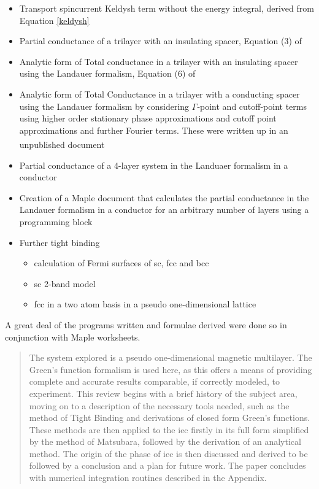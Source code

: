 \documentclass[a4paper, 12pt]{article}
\newcommand{\site}[1]{\textsuperscript{\textcolor{blue}{\cite{#1}}}}
\begin{document}
\begin{itemize}
	\item{Transport spincurrent Keldysh term without the energy integral, derived from Equation \eqref{keldysh}}
	\item{Partial conductance of a trilayer with an insulating spacer, Equation (3) of \textcolor{blue}{\cite{Mathon2016}}}
	\item{Analytic form of Total conductance in a trilayer with an insulating spacer using the Landauer formalism, Equation (6) of \textcolor{blue}{\cite{Mathon2016}}}
	\item{Analytic form of Total Conductance in a trilayer with a conducting spacer using the Landauer formalism by considering $\Gamma$-point and cutoff-point terms using higher order stationary phase approximations and cutoff point approximations and further Fourier terms. These were written up in an unpublished document\site{me}}
	\item{Partial conductance of a 4-layer system in the Landuaer formalism in a conductor}
	\item{Creation of a Maple document that calculates the partial conductance in the Landauer formalism in a conductor for an arbitrary number of layers using a programming block}
	\item{Further tight binding}
		\begin{itemize}
			\item{calculation of Fermi surfaces of \gls{sc}, \gls{fcc} and \gls{bcc}}
			\item{\gls{sc} 2-band model}
			\item{\gls{fcc} in a two atom basis in a pseudo one-dimensional lattice}
		\end{itemize}
\end{itemize}
A great deal of the programs written and formulae derived were done so in conjunction with Maple worksheets.
	\newpage
	\begin{abstract}
		The system explored is a pseudo one-dimensional magnetic multilayer. The Green's function formalism is used here, as this offers a means of providing complete and accurate results comparable, if correctly modeled, to experiment. This review begins with a brief history of the subject area, moving on to a description of the necessary tools needed, such as the method of Tight Binding and derivations of closed form Green's functions. These methods are then applied to the \gls{iec} firstly in its full form simplified by the method of Matsubara, followed by the derivation of an analytical method. The origin of the phase of \gls{iec} is then discussed and derived to be followed by a conclusion and a plan for future work. The paper concludes with numerical integration routines described in the Appendix.
	\end{abstract}
\end{document}
